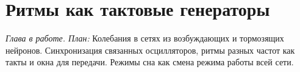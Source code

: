 \chapter{Ритмы как тактовые генераторы}
\label{sec:oscillations}

\emph{Глава в работе. План:} Колебания в сетях из возбуждающих и тормозящих нейронов. Синхронизация связанных осцилляторов, ритмы разных частот как такты и окна для передачи. Режимы сна как смена режима работы всей сети.
